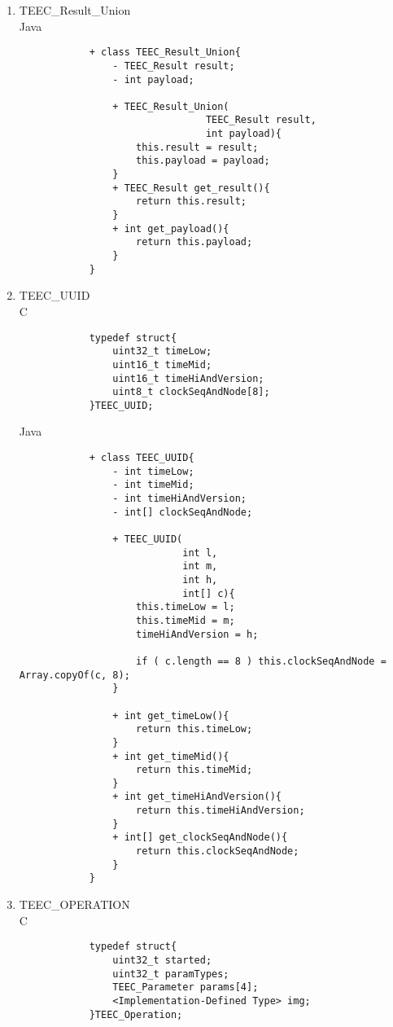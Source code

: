\documentclass{cseminar}
\begin{document}
\begin{enumerate}
\begin{lstlisting}
				+ TEEC_SharedMemory(
								Byte[] buffer,
								int flags,
								TEEC_IMP imp){
					this.buffer = Arrays.copyOf(buffer, buffer.length());
					this.flags = flags;
					this.imp = imp;
				}
				+ Byte[] get_buffer(){
					return this.buffer;				
				}				
				+ int get_flags(){
					return this.flags;				
				}
				+ TEEC_IMP get_imp(){
					return this.imp;				
				}
				
			}
			\end{lstlisting}
			
	
	\item TEEC\_Result\_Union
			\\Java
			\begin{lstlisting}
			+ class TEEC_Result_Union{
				- TEEC_Result result;
				- int payload;
				
				+ TEEC_Result_Union(
								TEEC_Result result,
								int payload){
					this.result = result;
					this.payload = payload;				
				}
				+ TEEC_Result get_result(){
					return this.result; 				
				}
				+ int get_payload(){
					return this.payload;				
				}
			}
			\end{lstlisting}
	
	\item TEEC\_UUID
			\\C
			\begin{lstlisting}
			typedef struct{
				uint32_t timeLow;
				uint16_t timeMid;
				uint16_t timeHiAndVersion;
				uint8_t clockSeqAndNode[8];			
			}TEEC_UUID;
			\end{lstlisting}
			
			Java
			\begin{lstlisting}
			+ class TEEC_UUID{
				- int timeLow;
				- int timeMid;
				- int timeHiAndVersion;
				- int[] clockSeqAndNode;
				
				+ TEEC_UUID(
							int l,
							int m,
							int h,
							int[] c){
					this.timeLow = l;
					this.timeMid = m;
					timeHiAndVersion = h;
					
					if ( c.length == 8 ) this.clockSeqAndNode = Array.copyOf(c, 8);				
				}
				
				+ int get_timeLow(){
					return this.timeLow;				
				}			
				+ int get_timeMid(){
					return this.timeMid;				
				}
				+ int get_timeHiAndVersion(){
					return this.timeHiAndVersion;				
				}
				+ int[] get_clockSeqAndNode(){
					return this.clockSeqAndNode;				
				}
			}
			\end{lstlisting}
	\item TEEC\_OPERATION
			\\C
			\begin{lstlisting}
			typedef struct{
				uint32_t started;
				uint32_t paramTypes;
				TEEC_Parameter params[4];
				<Implementation-Defined Type> img;
			}TEEC_Operation;
			\end{lstlisting}
			

\end{enumerate}
\end{document}
